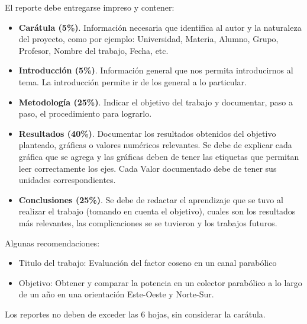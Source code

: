 \documentclass[spanish, letterpaper,12]{article}
\begin{document}
El reporte debe entregarse impreso y contener:
\begin{itemize}
\item \textbf{Carátula (5\%)}. Información necesaria que identifica al autor y la naturaleza del proyecto, como por ejemplo: Universidad, Materia, Alumno, Grupo, Profesor, Nombre del trabajo, Fecha, etc.
\item \textbf{Introducción (5\%)}. Información general que nos permita introducirnos al tema. La introducción permite ir de los general a lo particular.
\item \textbf{Metodología (25\%)}. Indicar el objetivo del trabajo y documentar, paso a paso, el procedimiento para lograrlo.   
\item \textbf{Resultados (40\%)}. Documentar los resultados obtenidos del objetivo planteado, gráficas o valores numéricos relevantes. Se debe de explicar cada gráfica que se agrega y las gráficas deben de tener las etiquetas que permitan leer correctamente los ejes. Cada Valor documentado debe de tener sus unidades correspondientes.
\item \textbf{Conclusiones (25\%)}. Se debe de redactar el aprendizaje que se tuvo al realizar el trabajo (tomando en cuenta el objetivo), cuales son los resultados más relevantes, las complicaciones se se tuvieron y los trabajos futuros.
\end{itemize}

Algunas recomendaciones:
\begin{itemize}
\item Titulo del trabajo: Evaluación del factor coseno en un canal parabólico
\item Objetivo: Obtener y comparar la potencia en un colector parabólico a lo largo de un año en una orientación Este-Oeste y Norte-Sur.
\end{itemize}

Los reportes no deben de exceder las 6 hojas, sin considerar la carátula.
\end{document}
